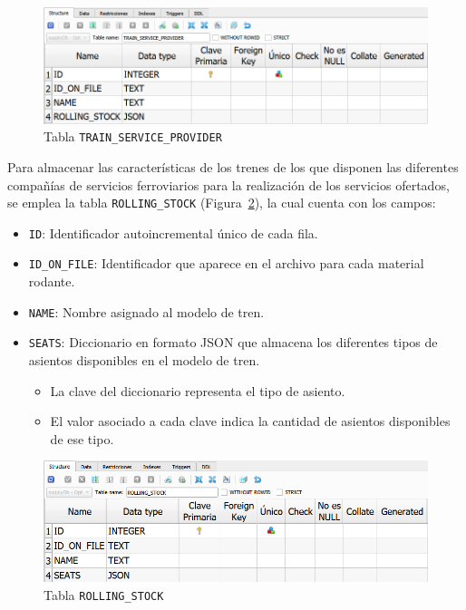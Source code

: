 \begin{figure}[H]
\centering
\includegraphics[width=.9\textwidth]{fig/Tablas base de datos/Oferta/TRAIN_SERVICE_PROVIDER.png}
\caption{Tabla \texttt{TRAIN\_SERVICE\_PROVIDER}}
\label{fig:dbSupplyTRAIN_SERVICE_PROVIDER}
\end{figure}
\newpage
Para almacenar las características de los trenes de los que disponen las diferentes compañías de servicios ferroviarios para la realización de los servicios ofertados, se emplea la tabla \texttt{ROLLING\_STOCK} (Figura~\ref{fig:dbSupplyROLLING_STOCK}), la cual cuenta con los campos: 
\begin{itemize}
    \item \texttt{ID}: Identificador autoincremental único de cada fila.
    \item \texttt{ID\_ON\_FILE}: Identificador que aparece en el archivo para cada material rodante.
    \item \texttt{NAME}: Nombre asignado al modelo de tren.
    \item \texttt{SEATS}: Diccionario en formato \acrshort{JSON} que almacena los diferentes tipos de asientos disponibles en el modelo de tren.
    \begin{itemize}
        \item La clave del diccionario representa el tipo de asiento.
        \item El valor asociado a cada clave indica la cantidad de asientos disponibles de ese tipo.
    \end{itemize}
\end{itemize}

\begin{figure}[H]
\centering
\includegraphics[width=.9\textwidth]{fig/Tablas base de datos/Oferta/ROLLING_STOCK.png}
\caption{Tabla \texttt{ROLLING\_STOCK}}
\label{fig:dbSupplyROLLING_STOCK}
\end{figure}

